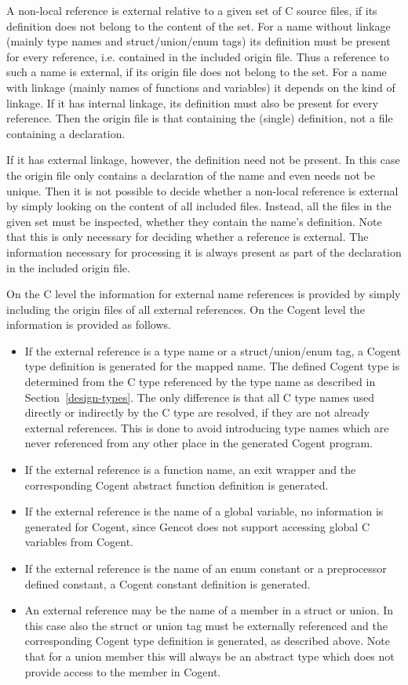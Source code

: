 A non-local reference is external relative to a given set of C source files, if its definition does not belong to the content
of the set. For a name without linkage (mainly type names and struct/union/enum tags) its definition must be present for every
reference, i.e. contained in the included origin file. Thus a reference to such a name is external, if its origin file does 
not belong to the set. For a name with linkage (mainly names of functions and variables) it depends on the kind of linkage.
If it has internal linkage, its definition must also be present for every reference. Then the origin file is that containing the
(single) definition, not a file containing a declaration. 

If it has external linkage, however, the definition need not be present. In this case the origin file only contains a declaration
of the name and even needs not be unique. Then it is not possible to decide whether a non-local reference is external by simply 
looking on the content of all included files. Instead, all the files in the given set must be inspected, whether they contain
the name's definition. Note that this is only necessary for deciding whether a reference is external. The information necessary
for processing it is always present as part of the declaration in the included origin file.

On the C level the information for external name references is provided by simply including the origin files of all external 
references. On the Cogent
level the information is provided as follows.
\begin{itemize}
\item If the external reference is a type name or a struct/union/enum tag, a Cogent type definition is generated for the mapped name.
The defined Cogent type is determined
from the C type referenced by the type name as described in Section~\ref{design-types}. The only difference is that all C type
names used directly or indirectly by the C type are resolved, if they are not already external references. This is done to avoid 
introducing type names which are never referenced from any other place in the generated Cogent program. 
\item If the external reference is a function name, an exit wrapper and the corresponding Cogent abstract function 
definition is generated.
\item If the external reference is the name of a global variable, no information is generated for Cogent, since Gencot does not
support accessing global C variables from Cogent.
\item If the external reference is the name of an enum constant or a preprocessor defined constant, a Cogent constant definition 
is generated.
\item An external reference may be the name of a member in a struct or union. In this case also the struct or union tag must
be externally referenced and the corresponding Cogent type definition is generated, as described above. Note that for a union
member this will always be an abstract type which does not provide access to the member in Cogent.
\end{itemize}
